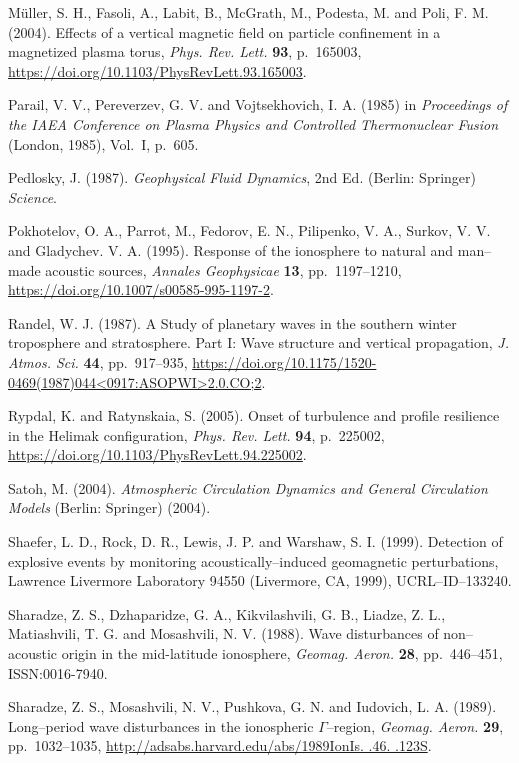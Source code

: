\documentclass[a4paper,openany,12pt]{book}
\begin{document}
\begin{thebibliography}{100}
\bibitem{}
M\"uller, S. H., Fasoli, A., Labit, B., McGrath, M., Podesta, M. and Poli, F. M. (2004). Effects of a vertical magnetic field on particle confinement in a magnetized plasma torus, {\it Phys. Rev. Lett.} \textbf{93}, p.~165003, 
\url{https://doi.org/10.1103/PhysRevLett.93.165003}.

\bibitem{}
Parail, V. V., Pereverzev, G. V. and Vojtsekhovich, I. A. (1985) in {\it Proceedings of the IAEA Conference on Plasma Physics and Controlled Thermonuclear Fusion} (London, 1985), Vol.~I, p.~605.

\bibitem{}
Pedlosky, J. (1987). \emph{Geophysical Fluid Dynamics}, 2nd Ed. (Berlin: Springer) \emph{Science}.

\bibitem{}
Pokhotelov, O. A., Parrot, M., Fedorov, E. N., Pilipenko, V. A., Surkov, V. V. and Gladychev. V. A. (1995). Response of the ionosphere to natural and man--made acoustic sources, \emph{Annales Geophysicae} \textbf{13}, pp.~1197--1210, \url{https://doi.org/10.1007/s00585-995-1197-2}.

\bibitem{}
Randel, W. J. (1987). A Study of planetary waves in the southern winter troposphere and stratosphere. Part I: Wave structure and vertical propagation, {\it J. Atmos. Sci.} \textbf{44}, pp.~917--935, \url{https://doi.org/10.1175/1520-0469(1987)044<0917:ASOPWI>2.0.CO;2}.
 
\bibitem{}
Rypdal, K. and Ratynskaia, S. (2005). Onset of turbulence and profile resilience in the Helimak configuration, {\it Phys. Rev. Lett.} \textbf{94}, p.~225002, \url{https://doi.org/10.1103/PhysRevLett.94.225002}.

\bibitem{}
Satoh, M. (2004). {\it Atmospheric Circulation Dynamics and General Circulation Models} (Berlin: Springer) (2004).

\bibitem{}
Shaefer, L. D., Rock, D. R., Lewis, J. P. and Warshaw, S. I. (1999). Detection of explosive events by monitoring acoustically--induced geomagnetic perturbations, Lawrence Livermore Laboratory 94550 (Livermore, CA, 1999), UCRL--ID--133240.

\bibitem{}
Sharadze, Z. S., Dzhaparidze, G. A., Kikvilashvili, G. B., Liadze, Z. L., Matiashvili, T. G. and Mosashvili, N. V. (1988). Wave disturbances of non--acoustic origin in the mid-latitude ionosphere, {\it Geomag. Aeron.} \textbf{28}, pp.~446--451, ISSN:0016-7940.

\bibitem{}
Sharadze, Z. S., Mosashvili, N. V., Pushkova, G. N. and Iudovich, L. A. (1989). Long--period wave disturbances in the ionospheric $\Gamma$--region, {\it Geomag. Aeron.} \textbf{29}, pp.~1032--1035, \url{http://adsabs.harvard.edu/abs/1989IonIs. .46. .123S}.


\end{thebibliography}
\end{document}
